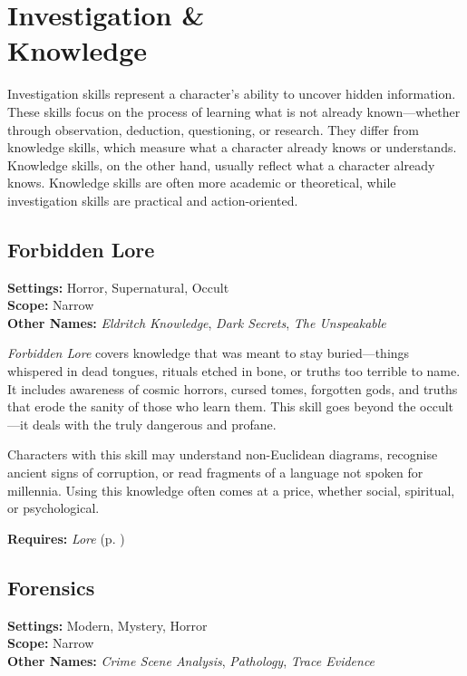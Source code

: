 


\section[Investigation \& Knowledge]{Investigation \&\\ Knowledge}

Investigation skills represent a character’s ability to uncover hidden information. These skills focus on the process of learning what is not already known—whether through observation, deduction, questioning, or research. They differ from knowledge skills, which measure what a character already knows or understands. Knowledge skills, on the other hand, usually reflect what a character already knows. Knowledge skills are often more academic or theoretical, while investigation skills are practical and action-oriented.

\subsection{Forbidden Lore}\label{skill:forbidden-lore}
\textbf{Settings:} Horror, Supernatural, Occult\\
\textbf{Scope:} Narrow\\
\textbf{Other Names:} \emph{Eldritch Knowledge}, \emph{Dark Secrets}, \emph{The Unspeakable}\\
\vspace{\baselineskip}

\emph{Forbidden Lore} covers knowledge that was meant to stay buried—things whispered in dead tongues, rituals etched in bone, or truths too terrible to name. It includes awareness of cosmic horrors, cursed tomes, forgotten gods, and truths that erode the sanity of those who learn them. This skill goes beyond the occult—it deals with the truly dangerous and profane.

Characters with this skill may understand non-Euclidean diagrams, recognise ancient signs of corruption, or read fragments of a language not spoken for millennia. Using this knowledge often comes at a price, whether social, spiritual, or psychological.

\vspace{0.5\baselineskip}
\noindent\textbf{Requires:} \emph{Lore} (p. \pageref{skill:lore})

\subsection{Forensics}\label{skill:forensics}
\textbf{Settings:} Modern, Mystery, Horror\\
\textbf{Scope:} Narrow\\
\textbf{Other Names:} \emph{Crime Scene Analysis}, \emph{Pathology}, \emph{Trace Evidence}\\
\vspace{\baselineskip}

